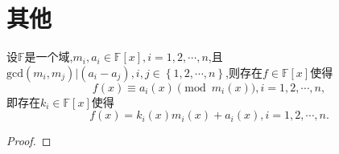 \documentclass[../../main.tex]{subfiles}%
\begin{document}
\section{其他}

\begin{theorem}\label{theorem:中国剩余定理推广(模不互质的情况)}
设$\mathbb{F}$是一个域,$m_i,a_i\in \mathbb{F}[x],i=1,2,\cdots,n$,且$\mathrm{gcd}\left( m_i,m_j \right) |\left( a_i-a_j \right) ,i,j\in \left\{ 1,2,\cdots ,n \right\}$,则存在$f\in\mathbb{F}[x]$使得
$$
f(x)\equiv a_i(x)\pmod{m_i(x)},i=1,2,\cdots,n,
$$
即存在$k_i\in\mathbb{F}[x]$使得
$$
f(x)=k_i(x)m_i(x)+a_i(x),i=1,2,\cdots,n.
$$
\end{theorem}
\begin{proof}

\end{proof}
\end{document}
